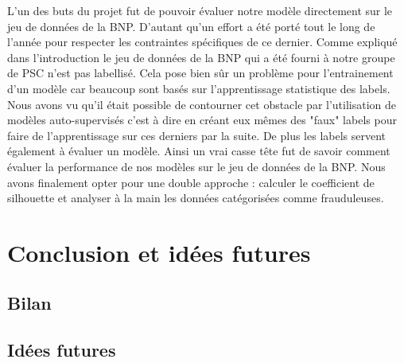 \documentclass[a4paper]{article}
\begin{document}
L'un des buts du projet fut de pouvoir évaluer notre modèle directement sur le jeu de données de la BNP. D'autant qu'un effort a été porté tout le long de l'année pour respecter les contraintes spécifiques de ce dernier. Comme expliqué dans l'introduction le jeu de données de la BNP qui a été fourni à notre groupe de PSC n'est pas labellisé. Cela pose bien sûr un problème pour l'entrainement d'un modèle car beaucoup sont basés sur l'apprentissage statistique des labels. Nous avons vu qu'il était possible de contourner cet obstacle par l'utilisation de modèles auto-supervisés c'est à dire en créant eux mêmes des "faux" labels pour faire de l'apprentissage sur ces derniers par la suite. De plus les labels servent également à évaluer un modèle. Ainsi un vrai casse tête fut de savoir comment évaluer la performance de nos modèles sur le jeu de données de la BNP. Nous avons finalement opter pour une double approche : calculer le coefficient de silhouette et analyser à la main les données catégorisées comme frauduleuses.

\section{Conclusion et idées futures}

\subsection{Bilan}

\subsection{Idées futures}
\end{document}

